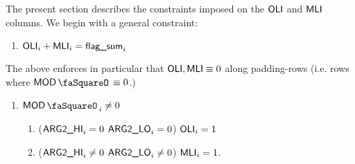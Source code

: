 The present section describes the constraints imposed on the $\textsf{OLI}$ and $\textsf{MLI}$ columns. We begin with a general constraint:
\begin{enumerate}
	\item $\textsf{OLI}_{i} + \textsf{MLI}_{i} = \textsf{flag\_sum}_{i}$
\end{enumerate}
The above enforces in particular that $\textsf{OLI}, \textsf{MLI} \equiv 0$ along padding-rows (i.e. rows where $\modStamp\equiv 0$.) 
\begin{enumerate}[resume]
	\item \If $\modStamp_{i} \neq 0$ \Then
		\begin{enumerate}
			\item \If \big($\textsf{ARG}\textsf{2}\textsf{\_HI}_{i} = 0$ \et $\textsf{ARG}\textsf{2}\textsf{\_LO}_{i} = 0$\big) \Then $\textsf{OLI}_{i} = 1$
			\item \If \big($\textsf{ARG}\textsf{2}\textsf{\_HI}_{i} \neq 0$ \OR $\textsf{ARG}\textsf{2}\textsf{\_LO}_{i} \neq 0$\big) \Then $\textsf{MLI}_{i} = 1$.
		\end{enumerate}
\end{enumerate}
